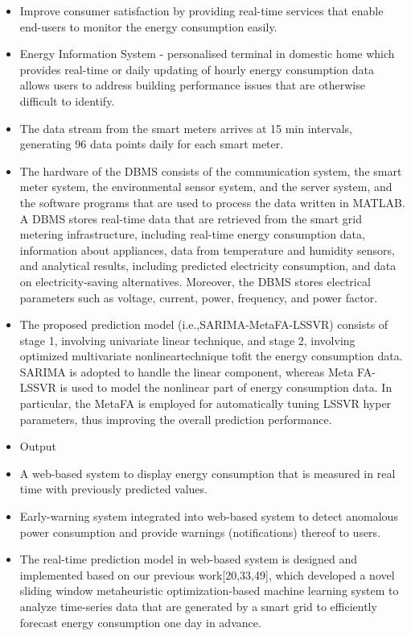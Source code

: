 \documentclass[11pt,]{article}
\providecommand{\tightlist}{%
  \setlength{\itemsep}{0pt}\setlength{\parskip}{0pt}}
\begin{document}
\begin{itemize}
\tightlist
\item
  Improve consumer satisfaction by providing real-time services that
  enable end-users to monitor the energy consumption easily.
\item
  Energy Information System - personalised terminal in domestic home
  which provides real-time or daily updating of hourly energy
  consumption data allows users to address building performance issues
  that are otherwise difficult to identify.
\item
  The data stream from the smart meters arrives at 15 min intervals,
  generating 96 data points daily for each smart meter.
\item
  The hardware of the DBMS consists of the communication system, the
  smart meter system, the environmental sensor system, and the server
  system, and the software programs that are used to process the data
  written in MATLAB. A DBMS stores real-time data that are retrieved
  from the smart grid metering infrastructure, including real-time
  energy consumption data, information about appliances, data from
  temperature and humidity sensors, and analytical results, including
  predicted electricity consumption, and data on electricity-saving
  alternatives. Moreover, the DBMS stores electrical parameters such as
  voltage, current, power, frequency, and power factor.
\item
  The proposed prediction model (i.e.,SARIMA-MetaFA-LSSVR) consists of
  stage 1, involving univariate linear technique, and stage 2, involving
  optimized multivariate nonlineartechnique tofit the energy consumption
  data. SARIMA is adopted to handle the linear component, whereas Meta
  FA-LSSVR is used to model the nonlinear part of energy consumption
  data. In particular, the MetaFA is employed for automatically tuning
  LSSVR hyper parameters, thus improving the overall prediction
  performance.
\item
  Output
\item
  A web-based system to display energy consumption that is measured in
  real time with previously predicted values.
\item
  Early-warning system integrated into web-based system to detect
  anomalous power consumption and provide warnings (notifications)
  thereof to users.
\item
  The real-time prediction model in web-based system is designed and
  implemented based on our previous work{[}20,33,49{]}, which developed
  a novel sliding window metaheuristic optimization-based machine
  learning system to analyze time-series data that are generated by a
  smart grid to efficiently forecast energy consumption one day in
  advance.
\end{itemize}
\end{document}
